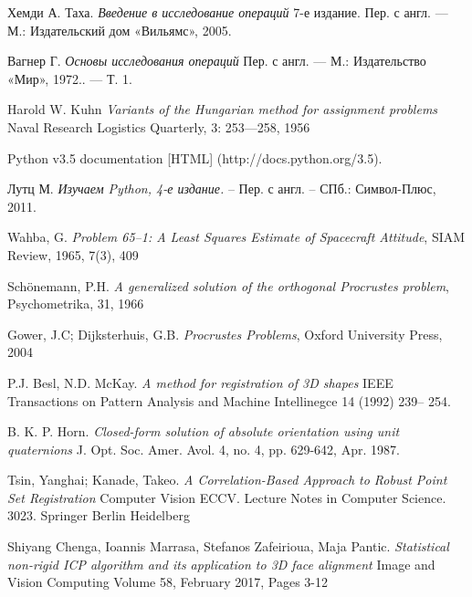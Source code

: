 \begin{thebibliography}{00}
 Хемди А. Таха.
\emph{Введение в исследование операций} 7-е издание. Пер. с англ. — М.: Издательский дом «Вильямс», 2005.

 Вагнер Г.
\emph{Основы исследования операций} Пер. с англ. — М.: Издательство «Мир», 1972.. — Т. 1.

 Harold W. Kuhn
\emph{Variants of the Hungarian method for assignment problems} Naval Research Logistics Quarterly, 3: 253—258, 1956

 Python v3.5 documentation
[HTML] (http://docs.python.org/3.5).

 Лутц М.
\emph{Изучаем Python, 4-е издание.} – Пер. с англ. – СПб.: Символ-Плюс, 2011.

 Wahba, G. 
\emph{Problem 65–1: A Least Squares Estimate of Spacecraft Attitude}, SIAM Review, 1965, 7(3), 409

  Schönemann, P.H.
\emph{A generalized solution of the orthogonal Procrustes problem}, Psychometrika, 31, 1966

 Gower, J.C; Dijksterhuis, G.B.
\emph{Procrustes Problems}, Oxford University Press, 2004

 P.J. Besl, N.D. McKay.
\emph{A method for registration of 3D shapes} IEEE Transactions on Pattern Analysis and Machine Intellinegce 14 (1992) 239– 254.

 B. K. P. Horn.
\emph{Closed-form solution of absolute orientation using unit quaternions} J. Opt. Soc. Amer. Avol. 4, no. 4, pp. 629-642, Apr. 1987.

 Tsin, Yanghai; Kanade, Takeo.
\emph{A Correlation-Based Approach to Robust Point Set Registration} Computer Vision ECCV. Lecture Notes in Computer Science. 3023. Springer Berlin Heidelberg

 Shiyang Chenga, Ioannis Marrasa, Stefanos Zafeirioua, Maja Pantic.
\emph{Statistical non-rigid ICP algorithm and its application to 3D face alignment} Image and Vision Computing
Volume 58, February 2017, Pages 3-12


\end{thebibliography}